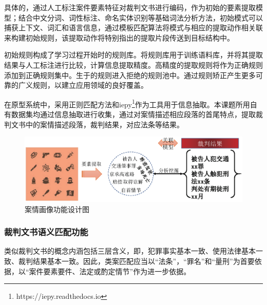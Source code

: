 具体的，通过人工标注案件要素特征对裁判文书进行编码，作为初始的要素提取模型；结合中文分词、词性标注、命名实体识别等基础词法分析方法，初始模式可以捕获上下文、词汇和语言信息，通过模板匹配算法将模式与相应的提取动作相关联来构建初始规则，该提取动作将特别指出的提取片段传送到目标结构中。

初始规则构成了学习过程开始时的规则库。将规则库用于训练语料库，并将其提取结果与人工标注进行比较，计算信息提取精度。高精度的提取规则将作为正确规则添加到正确规则集中。生于的规则进入拒绝的规则池中。通过规则矫正产生更多可靠的广义规则，以建立应用领域的良好覆盖。

在原型系统中，采用正则匹配方法和iepy\footnote{https://iepy.readthedocs.io}作为工具用于信息抽取。本课题所用自有数据集均通过信息抽取进行收集，通过对案情描述相应段落的首尾特点，提取裁判文书中的案情描述段落，裁判结果，对应法条等结果。



\begin{figure}[htbp]%
    \centering
    \includegraphics[scale=0.5, clip=true]{./sources/sys_picture.eps}
    \caption{\label{fig:sys_picture}案情画像功能设计图}
\end{figure}


\subsubsection{裁判文书语义匹配功能}
\label{sec:sys_content}
类似裁判文书的概念内涵包括三层含义，即，犯罪事实基本一致、使用法律基本一致、裁判结果基本一致。因此，类案匹配应当以“法条”，“罪名”和“量刑”为首要依据，以“案件要素要件、法定或酌定情节”作为进一步依据。

